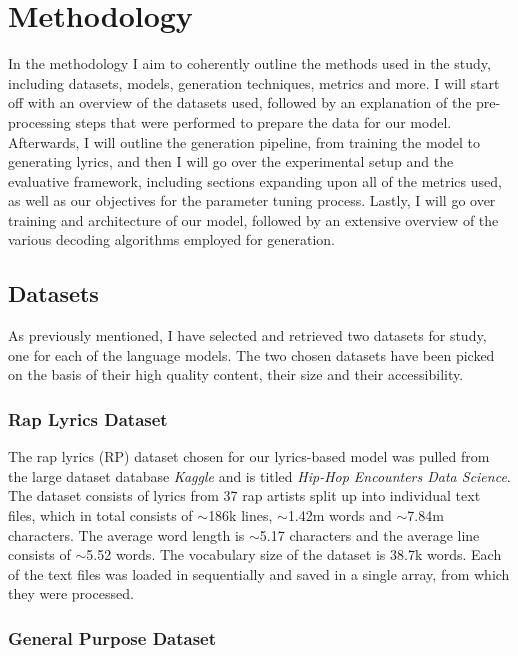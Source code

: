\section{Methodology}
\label{chap:methodology}
In the methodology I aim to coherently outline the methods used in the study, including datasets, models, generation techniques, metrics and more. I will start off with an overview of the datasets used, followed by an explanation of the pre-processing steps that were performed to prepare the data for our model. Afterwards, I will outline the generation pipeline, from training the model to generating lyrics, and then I will go over the experimental setup and the evaluative framework, including sections expanding upon all of the metrics used, as well as our objectives for the parameter tuning process. Lastly, I will go over training and architecture of our model, followed by an extensive overview of the various decoding algorithms employed for generation.

\subsection{Datasets}
\label{sec:datasets}

As previously mentioned, I have selected and retrieved two datasets for study, one for each of the language models. The two chosen datasets have been picked on the basis of their high quality content, their size and their accessibility.

\subsubsection{Rap Lyrics Dataset}
\label{rap-dataset}

The rap lyrics (RP) dataset chosen for our lyrics-based model was pulled from the large dataset database \textit{Kaggle} and is titled \textit{Hip-Hop Encounters Data Science}. The dataset consists of lyrics from 37 rap artists split up into individual text files, which in total consists of $\sim$186k lines, $\sim$1.42m words and $\sim$7.84m characters. The average word length is $\sim$5.17 characters and the average line consists of $\sim$5.52 words. The vocabulary size of the dataset is 38.7k words. Each of the text files was loaded in sequentially and saved in a single array, from which they were processed.

\subsubsection{General Purpose Dataset}
\label{general-dataset}

